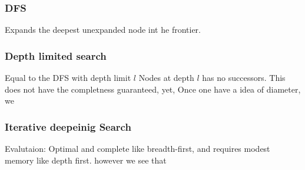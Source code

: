 \documentclass[9pt]{article}
\begin{document}
\subsubsection{DFS}
Expands the deepest unexpanded node int he frontier.

\subsubsection{Depth limited search}
Equal to the DFS with depth limit $l$
Nodes at depth $l$ has no successors.
This does not have the completness guaranteed, yet, Once one have a idea of diameter, we


\subsubsection{Iterative deepeinig Search}
Evalutaion: Optimal and complete like breadth-first, and requires modest memory like depth first. however we see that
\end{document}
